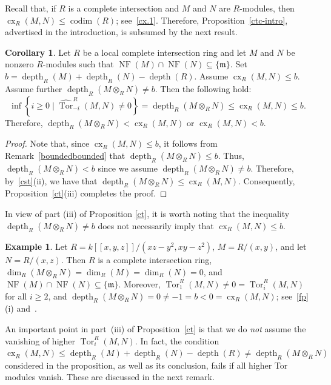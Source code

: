 \documentclass[11pt]{amsart}
\theoremstyle{definition}
\newtheorem{cor}[thm]{Corollary}
\theoremstyle{definition}
\newtheorem{eg}[thm]{Example}
\numberwithin{equation}{section}
\newcommand{\fm}{\mathfrak{m}}
\DeclareMathOperator{\cx}{cx}
\DeclareMathOperator{\depth}{depth}
\DeclareMathOperator{\Tor}{Tor}
\DeclareMathOperator{\cod}{codim}
\DeclareMathOperator{\NF}{NF}
\begin{document}
Recall that, if $R$ is a complete intersection and $M$ and $N$ are $R$-modules, then $\cx_R(M,N) \leq \cod(R)$; see~\eqref{cx.1}. Therefore, Proposition~\ref{ctc-intro}, advertised in the introduction, is subsumed by the next result.

\begin{cor} \label{ctc-main} Let $R$ be a local complete intersection ring and let $M$ and $N$ be nonzero $R$-modules such that $\NF(M)\cap\NF(N)\subseteq\{\fm\}$. Set $b=\depth_R(M)+\depth_R(N)-\depth(R)$. Assume $\cx_R(M,N) \leq b$. Assume further $\depth_R(M\otimes_RN)\neq b$. Then the following hold:
\[
 \inf \left\{i\geq0\mid\widehat{\Tor}_{-i}^R(M,N)\neq0\right\}=\depth_R(M\otimes_RN) \leq \cx_R(M,N) \leq b. 
 \]
Therefore, $\depth_R(M\otimes_RN) < \cx_R(M,N)$ or $\cx_R(M,N)<b$.
\end{cor}

\begin{proof} Note that, since $\cx_R(M,N) \leq b$, it follows from Remark~\ref{boundedbounded} that $\depth_R(M\otimes_RN)\leq b$. Thus, $\depth_R(M\otimes_RN)< b$ since we assume $\depth_R(M\otimes_RN)\neq b$. Therefore, by~\ref{cst}(ii), we have that $\depth_R(M\otimes_{R} N)\leq \cx_R(M,N)$. Consequently, Proposition~\ref{ct}(iii) completes the proof.
\end{proof}

In view of part (iii) of Proposition \ref{ct}, it is worth noting that the inequality $\depth_R(M \otimes_R N)\neq b$ does not necessarily imply that $\cx_R(M, N)\leq b$.

\begin{eg} Let $R=k[\![x,y,z]\!]/(xz-y^2, xy-z^2)$, $M=R/(x,y)$, and let $N=R/(x,z)$. Then $R$ is a complete intersection ring, $\dim_R(M\otimes_RN)=\dim_R(M)=\dim_R(N)=0$, and $\NF(M)\cap\NF(N)\subseteq\{\fm\}$. Moreover, $\Tor_1^R(M,N)\neq 0=\Tor_i^R(M,N)$ for all $i\geq 2$, and $\depth_R(M \otimes_R N)=0 \neq -1=b<0=\cx_R(M,N)$; see~\ref{fp}(i) and~\cite[4.2]{Jo1}. 
\end{eg}

An important point in part~(iii) of Proposition~\ref{ct} is that we do \emph{not} assume the vanishing of higher $\Tor_i^R(M, N)$. In fact, the condition $\cx_R(M, N) \leq \depth_R(M) + \depth_R(N) - \depth(R) \neq \depth_R(M \otimes_R N)$ considered in the proposition, as well as its conclusion, fails if all higher Tor modules vanish. These are discussed in the next remark.
\end{document}
